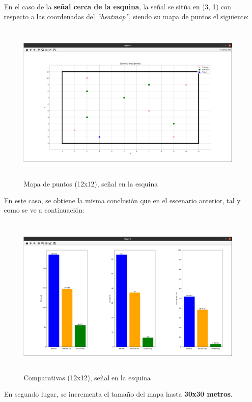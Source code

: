 En el caso de la \textbf{señal cerca de la esquina}, la señal se sitúa en (3, 1) con respecto a las coordenadas del \emph{``heatmap''}, siendo su mapa de puntos el siguiente:

\begin{figure} [H]
    \begin{center}
    \includegraphics[height=8cm]{imagenes/cap4/19_mapa_p_esq_12.png}
    \end{center}
    \caption[Mapa de puntos (12x12), señal en la esquina]{Mapa de puntos (12x12), señal en la esquina}
    \label{fig:map_p_esq_12}
\end{figure}

En este caso, se obtiene la misma conclusión que en el escenario anterior, tal y como se ve a continuación:\\

\begin{figure} [H]
    \begin{center}
    \includegraphics[height=8cm]{imagenes/cap4/20_comp_esq_12.png}
    \end{center}
    \caption[Comparativas (12x12), señal en la esquina]{Comparativas (12x12), señal en la esquina}
    \label{fig:comp_esq_12}
\end{figure}
\newpage
En segundo lugar, se incrementa el tamaño del mapa hasta \textbf{30x30 metros}.\\

